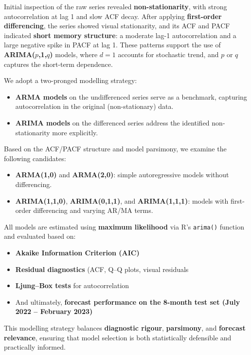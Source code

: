 \documentclass[
  11pt,
]{article}
\begin{document}
Initial inspection of the raw series revealed \textbf{non-stationarity},
with strong autocorrelation at lag 1 and slow ACF decay. After applying
\textbf{first-order differencing}, the series showed visual
stationarity, and its ACF and PACF indicated \textbf{short memory
structure}: a moderate lag-1 autocorrelation and a large negative spike
in PACF at lag 1. These patterns support the use of
\textbf{ARIMA(}\(p\)\textbf{,1,}\(q\)\textbf{)} models, where \(d=1\)
accounts for stochastic trend, and \(p\) or \(q\) captures the
short-term dependence.

We adopt a two-pronged modelling strategy:

\begin{itemize}
\item
  \textbf{ARMA models} on the undifferenced series serve as a benchmark,
  capturing autocorrelation in the original (non-stationary) data.
\item
  \textbf{ARIMA models} on the differenced series address the identified
  non-stationarity more explicitly.
\end{itemize}

Based on the ACF/PACF structure and model parsimony, we examine the
following candidates:

\begin{itemize}
\item
  \textbf{ARMA(1,0)} and \textbf{ARMA(2,0)}: simple autoregressive
  models without differencing.
\item
  \textbf{ARIMA(1,1,0)}, \textbf{ARIMA(0,1,1)}, and
  \textbf{ARIMA(1,1,1)}: models with first-order differencing and
  varying AR/MA terms.
\end{itemize}

All models are estimated using \textbf{maximum likelihood} via R's
\texttt{arima()} function and evaluated based on:

\begin{itemize}
\item
  \textbf{Akaike Information Criterion (AIC)}
\item
  \textbf{Residual diagnostics} (ACF, Q--Q plots, visual residuals
\item
  \textbf{Ljung--Box tests} for autocorrelation
\item
  And ultimately, \textbf{forecast performance on the 8-month test set
  (July 2022 -- February 2023)}
\end{itemize}

This modelling strategy balances \textbf{diagnostic rigour},
\textbf{parsimony}, and \textbf{forecast relevance}, ensuring that model
selection is both statistically defensible and practically informed.
\end{document}
